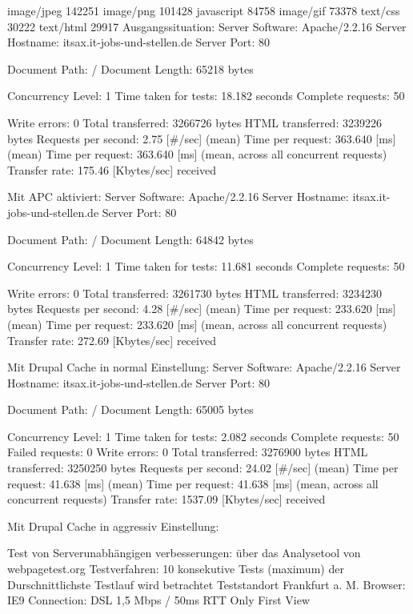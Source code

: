 image/jpeg	142251
image/png	101428
javascript	84758
image/gif	73378
text/css	30222
text/html	29917
Ausgangssituation:
Server Software:        Apache/2.2.16
Server Hostname:        itsax.it-jobs-und-stellen.de
Server Port:            80

Document Path:          /
Document Length:        65218 bytes

Concurrency Level:      1
Time taken for tests:   18.182 seconds
Complete requests:      50

Write errors:           0
Total transferred:      3266726 bytes
HTML transferred:       3239226 bytes
Requests per second:    2.75 [\#/sec] (mean)
Time per request:       363.640 [ms] (mean)
Time per request:       363.640 [ms] (mean, across all concurrent requests)
Transfer rate:          175.46 [Kbytes/sec] received




Mit APC aktiviert:
Server Software:        Apache/2.2.16
Server Hostname:        itsax.it-jobs-und-stellen.de
Server Port:            80

Document Path:          /
Document Length:        64842 bytes

Concurrency Level:      1
Time taken for tests:   11.681 seconds
Complete requests:      50

Write errors:           0
Total transferred:      3261730 bytes
HTML transferred:       3234230 bytes
Requests per second:    4.28 [\#/sec] (mean)
Time per request:       233.620 [ms] (mean)
Time per request:       233.620 [ms] (mean, across all concurrent requests)
Transfer rate:          272.69 [Kbytes/sec] received

Mit Drupal Cache in normal Einstellung:
Server Software:        Apache/2.2.16
Server Hostname:        itsax.it-jobs-und-stellen.de
Server Port:            80

Document Path:          /
Document Length:        65005 bytes

Concurrency Level:      1
Time taken for tests:   2.082 seconds
Complete requests:      50
Failed requests:        0
Write errors:           0
Total transferred:      3276900 bytes
HTML transferred:       3250250 bytes
Requests per second:    24.02 [\#/sec] (mean)
Time per request:       41.638 [ms] (mean)
Time per request:       41.638 [ms] (mean, across all concurrent requests)
Transfer rate:          1537.09 [Kbytes/sec] received

Mit Drupal Cache in aggressiv Einstellung:



Test von Serverunabhängigen verbesserungen:
über das Analysetool von webpagetest.org
Testverfahren: 10 konsekutive Tests (maximum) der Durschnittlichste Testlauf wird betrachtet
Teststandort Frankfurt a. M.
Browser: IE9
Connection: DSL 1,5 Mbps / 50ms RTT
Only First View




